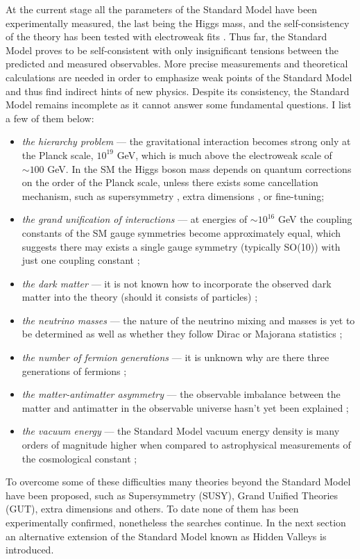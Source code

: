 At the current stage all the parameters of the Standard Model have been experimentally measured,
the last being the Higgs mass, and the
self-consistency of the theory has been tested with electroweak fits \cite{Baak:2013ppa}.
Thus far, the Standard Model proves to be self-consistent with only insignificant tensions between
the predicted and measured observables. More precise measurements and theoretical calculations
are needed in order to emphasize weak points of the Standard Model and thus
find indirect hints of new physics.
Despite its consistency, the Standard Model remains incomplete as it cannot answer some fundamental 
questions. I list a few of them below:
\begin{itemize}
 \item {\it the hierarchy problem} --- the gravitational interaction becomes strong only at the 
Planck scale, $10^{19}$ GeV, which is much above the electroweak scale of $\sim 100$ GeV. 
In the SM the Higgs boson mass 
depends on quantum corrections on the order of the Planck scale, unless there
exists some cancellation mechanism, such as supersymmetry \cite{Martin:1997ns}, extra dimensions
\cite{ArkaniHamed:1998rs,Zee:2003mt}, or fine-tuning; 
 \item {\it the grand unification of interactions} --- at energies of $\sim 10^{16}$ GeV
the coupling constants of the SM gauge symmetries become approximately equal, which suggests
there may exists a single gauge symmetry (typically SO(10)) with just one coupling constant
\cite{Georgi:1974sy,Buras197866};
 \item {\it the dark matter} --- it is not known how to incorporate the observed
 dark matter into the theory (should it consists of particles) \cite{Bertone2005279};
 \item {\it the neutrino masses} --- the nature of the neutrino mixing and masses is yet to be
determined as well as whether they follow Dirac or Majorana statistics \cite{Fukuda:1998fd};
 \item {\it the number of fermion generations} --- it is unknown why are there three generations
of fermions \cite{Decamp:1989tu};
 \item {\it the matter-antimatter asymmetry} --- the observable imbalance between the matter and
antimatter in the observable universe hasn't yet been explained \cite{Fukugita:1986hr};
 \item {\it the vacuum energy} --- the Standard Model vacuum
energy density is many orders of magnitude higher when compared to astrophysical measurements
of the cosmological constant \cite{Sahni:1999gb,Rugh2002663};
\end{itemize}
To overcome some of these difficulties many theories beyond the Standard Model have been
proposed, such as Supersymmetry (SUSY), Grand Unified Theories (GUT), extra dimensions and others.
To date none of them has been experimentally confirmed, nonetheless the searches continue.
In the next section an alternative extension of the Standard Model known as Hidden Valleys 
is introduced. 

